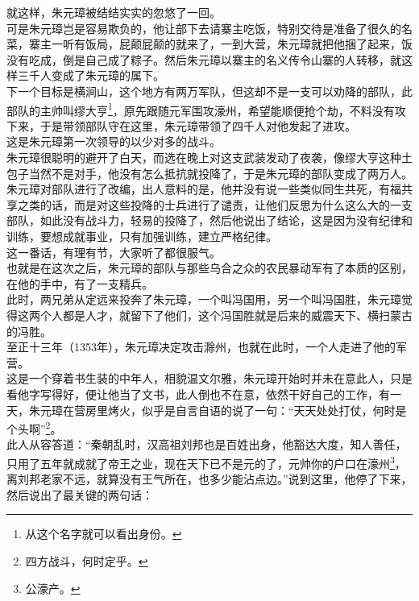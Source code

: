 \begin{multicols}{\theparacolNo}
就这样，朱元璋被结结实实的忽悠了一回。\\

可是朱元璋岂是容易欺负的，他让部下去请寨主吃饭，特别交待是准备了很久的名菜，寨主一听有饭局，屁颠屁颠的就来了，一到大营，朱元璋就把他捆了起来，饭没有吃成，倒是自己成了粽子。然后朱元璋以寨主的名义传令山寨的人转移，就这样三千人变成了朱元璋的属下。\\

下一个目标是横涧山，这个地方有两万军队，但这却不是一支可以劝降的部队，此部队的主帅叫缪大亨\footnote{从这个名字就可以看出身份。}，原先跟随元军围攻濠州，希望能顺便抢个劫，不料没有攻下来，于是带领部队守在这里，朱元璋带领了四千人对他发起了进攻。\\

这是朱元璋第一次领导的以少对多的战斗。\\

朱元璋很聪明的避开了白天，而选在晚上对这支武装发动了夜袭，像缪大亨这种土包子当然不是对手，他没有怎么抵抗就投降了，于是朱元璋的部队变成了两万人。\\

朱元璋对部队进行了改编，出人意料的是，他并没有说一些类似同生共死，有福共享之类的话，而是对这些投降的士兵进行了谴责，让他们反思为什么这么大的一支部队，如此没有战斗力，轻易的投降了，然后他说出了结论，这是因为没有纪律和训练，要想成就事业，只有加强训练，建立严格纪律。\\

这一番话，有理有节，大家听了都很服气。\\

也就是在这次之后，朱元璋的部队与那些乌合之众的农民暴动军有了本质的区别，在他的手中，有了一支精兵。\\

此时，两兄弟从定远来投奔了朱元璋，一个叫冯国用，另一个叫冯国胜，朱元璋觉得这两个人都是人才，就留下了他们，这个冯国胜就是后来的威震天下、横扫蒙古的冯胜。\\

至正十三年（1353年），朱元璋决定攻击滁州，也就在此时，一个人走进了他的军营。\\

这是一个穿着书生装的中年人，相貌温文尔雅，朱元璋开始时并未在意此人，只是看他字写得好，便让他当了文书，此人倒也不在意，依然干好自己的工作，有一天，朱元璋在营房里烤火，似乎是自言自语的说了一句：“天天处处打仗，何时是个头啊”\footnote{四方战斗，何时定乎。}。\\

此人从容答道：“秦朝乱时，汉高祖刘邦也是百姓出身，他豁达大度，知人善任，只用了五年就成就了帝王之业，现在天下已不是元的了，元帅你的户口在濠州\footnote{公濠产。}，离刘邦老家不远，就算没有王气所在，也多少能沾点边。”说到这里，他停了下来，然后说出了最关键的两句话：\\


\end{multicols}
